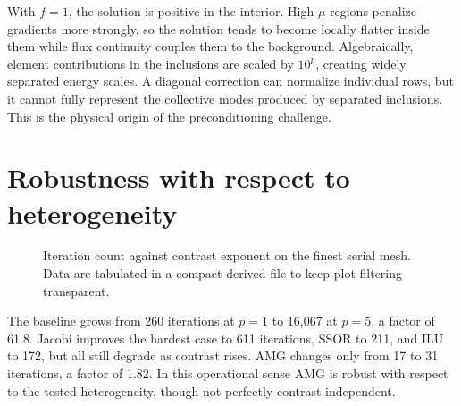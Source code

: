 \documentclass[10pt,a4paper]{article}
\newcommand{\methodstyle}[2]{\addplot+[thick,mark=#1,color=#2]}
\begin{document}
With $f=1$, the solution is positive in the interior. High-$\mu$ regions penalize gradients more
strongly, so the solution tends to become locally flatter inside them while flux continuity couples
them to the background. Algebraically, element contributions in the inclusions are scaled by
$10^p$, creating widely separated energy scales. A diagonal correction can normalize individual
rows, but it cannot fully represent the collective modes produced by separated inclusions. This is
the physical origin of the preconditioning challenge.

\newpage
\section{Robustness with respect to heterogeneity}
\begin{figure}[h]
\centering
{}
\caption{Iteration count against contrast exponent on the finest serial mesh. Data are tabulated
in a compact derived file to keep plot filtering transparent.}
\label{fig:heterogeneity}
\end{figure}

The baseline grows from 260 iterations at $p=1$ to 16,067 at $p=5$, a factor of 61.8. Jacobi
improves the hardest case to 611 iterations, SSOR to 211, and ILU to 172, but all still degrade as
contrast rises. AMG changes only from 17 to 31 iterations, a factor of 1.82. In this operational
sense AMG is robust with respect to the tested heterogeneity, though not perfectly contrast
independent.

\newpage
\end{document}
